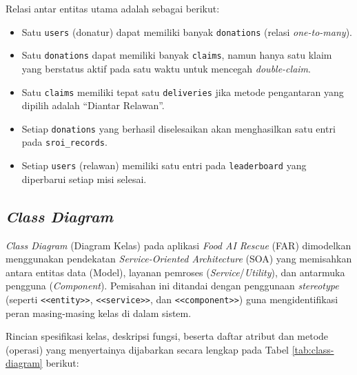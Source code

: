 \newpage
\begin{landscape}
\pagestyle{lscape}
    \centering
    \vfill
    
    \captionsetup{hypcap=false}
    \label{fig:erd}
    \vfill
\end{landscape}
\pagestyle{fancy}

\newpage

\noindent Relasi antar entitas utama adalah sebagai berikut:
\begin{itemize}
    \item Satu \texttt{users} (donatur) dapat memiliki banyak \texttt{donations} (relasi \textit{one-to-many}).
    \item Satu \texttt{donations} dapat memiliki banyak \texttt{claims}, namun hanya satu klaim yang berstatus aktif pada satu waktu untuk mencegah \textit{double-claim}.
    \item Satu \texttt{claims} memiliki tepat satu \texttt{deliveries} jika metode pengantaran yang dipilih adalah ``Diantar Relawan''.
    \item Setiap \texttt{donations} yang berhasil diselesaikan akan menghasilkan satu entri pada \texttt{sroi\_records}.
    \item Setiap \texttt{users} (relawan) memiliki satu entri pada \texttt{leaderboard} yang diperbarui setiap misi selesai.
\end{itemize}

\subsection{\textit{Class Diagram}}
\textit{Class Diagram} (Diagram Kelas) pada aplikasi \textit{Food AI Rescue} (FAR) dimodelkan menggunakan pendekatan \textit{Service-Oriented Architecture} (SOA) yang memisahkan antara entitas data (Model), layanan pemroses (\textit{Service}/\textit{Utility}), dan antarmuka pengguna (\textit{Component}). Pemisahan ini ditandai dengan penggunaan \textit{stereotype} (seperti \texttt{<<entity>>}, \texttt{<<service>>}, dan \texttt{<<component>>}) guna mengidentifikasi peran masing-masing kelas di dalam sistem.

Rincian spesifikasi kelas, deskripsi fungsi, beserta daftar atribut dan metode (operasi) yang menyertainya dijabarkan secara lengkap pada Tabel \ref{tab:class-diagram} berikut:

